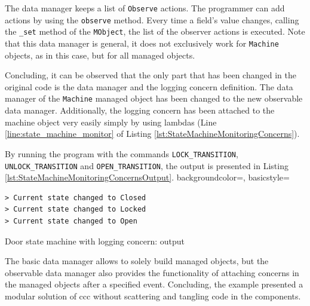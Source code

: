 The data manager keeps a list of \texttt{Observe} actions.
The programmer can add actions by using the \texttt{observe} method.
Every time a field's value changes, calling the \texttt{\_set} method of the \texttt{MObject}, the list of the observer actions is executed.
Note that this data manager is general, it does not exclusively work for \texttt{Machine} objects, as in this case, but for all managed objects.

Concluding, it can be observed that the only part that has been changed in the original code is the data manager and the logging concern definition.
The data manager of the \texttt{Machine} managed object has been changed to the new observable data manager.
Additionally, the logging concern has been attached to the machine object very easily simply by using lambdas (Line \ref{line:state_machine_monitor} of Listing \ref{lst:StateMachineMonitoringConcerns}).

By running the program with the commands \texttt{LOCK\_TRANSITION}, \texttt{UNLOCK\_TRANSITION} and \texttt{OPEN\_TRANSITION}, the output is presented in Listing \ref{lst:StateMachineMonitoringConcernsOutput}.
 {
    backgroundcolor=\color{white},
    basicstyle=\scriptsize\color{black}\ttfamily
}

\begin{sourcecode} [H]
	\lstset{numbers=none}
	\begin{lstlisting}[style=Bash]
> Current state changed to Closed
> Current state changed to Locked
> Current state changed to Open
	\end{lstlisting}
	\caption{Door state machine with logging concern: output}
	\label{lst:StateMachineMonitoringConcernsOutput}
\end{sourcecode}

The basic data manager allows to solely build managed objects, but the observable data manager also provides the functionality of attaching concerns in the managed objects after a specified event.
Concluding, the example presented a modular solution of \ac{ccc} without scattering and tangling code in the components.
